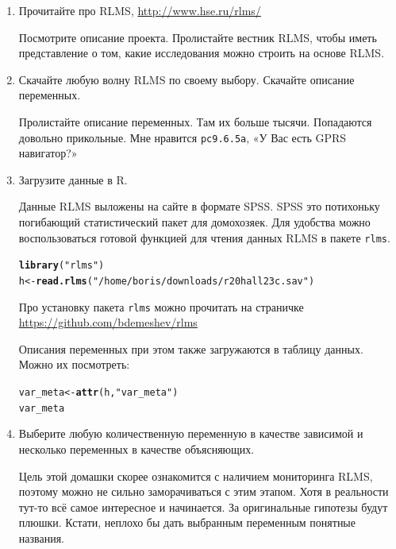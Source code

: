 \documentclass[12pt, a4paper]{article}\usepackage[]{graphicx}\usepackage[]{color}
\makeatletter
\newcommand{\hlstr}[1]{\textcolor[rgb]{0.192,0.494,0.8}{#1}}%
\newcommand{\hlstd}[1]{\textcolor[rgb]{0.345,0.345,0.345}{#1}}%
\newcommand{\hlkwb}[1]{\textcolor[rgb]{0.69,0.353,0.396}{#1}}%
\newcommand{\hlkwd}[1]{\textcolor[rgb]{0.737,0.353,0.396}{\textbf{#1}}}%
\newenvironment{kframe}{%
 \def\at@end@of@kframe{}%
 \ifinner\ifhmode%
  \def\at@end@of@kframe{\end{minipage}}%
  \begin{minipage}{\columnwidth}%
 \fi\fi%
 \def\FrameCommand##1{\hskip\@totalleftmargin \hskip-\fboxsep
 \colorbox{shadecolor}{##1}\hskip-\fboxsep
     \hskip-\linewidth \hskip-\@totalleftmargin \hskip\columnwidth}%
 \MakeFramed {\advance\hsize-\width
   \@totalleftmargin\z@ \linewidth\hsize
   \@setminipage}}%
 {\par\unskip\endMakeFramed%
 \at@end@of@kframe}
\newenvironment{knitrout}{}{} %
\makeatother
\begin{document}
\begin{enumerate}
\item Прочитайте про RLMS, \url{http://www.hse.ru/rlms/}

Посмотрите описание проекта. Пролистайте вестник RLMS, чтобы иметь представление о том, какие исследования можно строить на основе RLMS.

\item Скачайте любую волну RLMS по своему выбору. Скачайте описание переменных.

Пролистайте описание переменных. Там их больше тысячи. Попадаются довольно прикольные. Мне нравится \verb|pc9.6.5a|, «У Вас есть GPRS навигатор?»

\item Загрузите данные в R.

Данные RLMS выложены на сайте в формате SPSS. SPSS это потихоньку погибающий статистический пакет для домохозяек. Для удобства можно воспользоваться готовой функцией для чтения данных RLMS в пакете \verb|rlms|.
\begin{knitrout}
\color{fgcolor}\begin{kframe}
\begin{alltt}
\hlkwd{library}\hlstd{(}\hlstr{"rlms"}\hlstd{)}
\hlstd{h} \hlkwb{<-} \hlkwd{read.rlms}\hlstd{(}\hlstr{"/home/boris/downloads/r20hall23c.sav"}\hlstd{)}
\end{alltt}
\end{kframe}
\end{knitrout}
Про установку пакета \verb|rlms| можно прочитать на страничке \url{https://github.com/bdemeshev/rlms}

Описания переменных при этом также загружаются в таблицу данных. Можно их посмотреть:
\begin{knitrout}
\color{fgcolor}\begin{kframe}
\begin{alltt}
\hlstd{var_meta} \hlkwb{<-} \hlkwd{attr}\hlstd{(h,}\hlstr{"var_meta"}\hlstd{)}
\hlstd{var_meta}
\end{alltt}
\end{kframe}
\end{knitrout}

\item Выберите любую количественную переменную в качестве зависимой и несколько переменных в качестве объясняющих.

Цель этой домашки скорее ознакомится с наличием мониторинга RLMS, поэтому можно не сильно заморачиваться с этим этапом. Хотя в реальности тут-то всё самое интересное и начинается. За оригинальные гипотезы будут плюшки. Кстати, неплохо бы дать выбранным переменным понятные названия.


\end{enumerate}
\end{document}
